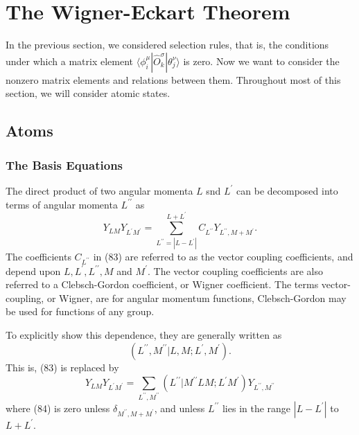 \section{The Wigner-Eckart Theorem}

In the previous section, we considered selection rules, that is, the 
conditions under which a matrix element $\langle \phi^{\mu}_i | 
{\hat{O}}^{\sigma}_k | \theta^{\nu}_j \rangle$ is zero.  Now we want 
to consider the nonzero matrix elements and relations between them. 
Throughout most of this section, we will consider atomic states.

\subsection{Atoms}

\subsubsection{The Basis Equations}

The direct product of two angular momenta $L$ snd $L^{\prime}$ can be 
decomposed into terms of angular momenta $L^{\prime \prime}$ as
\begin{equation}
Y_{LM} Y_{L^{\prime}M^{\prime}} = \sum^{L+L^{\prime}}_{L^{\prime 
\prime}=| L- L^{\prime}|} C_{L^{\prime \prime}}Y_{L^{\prime 
\prime},M+M^{\prime}}.
\label{chap16-eqno83}
\end{equation}
The coefficients $C_{L^{\prime \prime}}$ in (83) are referred to as 
the vector coupling coefficients, and depend upon $L, L^{\prime}, 
L^{\prime \prime}, M$ and $M^{\prime}$.  The vector coupling 
coefficients are also referred to a Clebsch-Gordon coefficient, or 
Wigner coefficient.  The terms vector-coupling, or Wigner, are for 
angular momentum functions, Clebsch-Gordon may be used for functions 
of any group. 

To explicitly show this dependence, they are generally written as
\begin{equation}
\left( L^{\prime \prime} , M^{\prime \prime} | L, M ; L^{\prime} , 
M^{\prime} \right).
\label{chap16-eqno84}
\end{equation}
This is, (83) is replaced by
\begin{equation}
Y_{LM} Y_{L^{\prime}M^{\prime}} = \sum_{L^{\prime \prime} , M^{\prime 
\prime}} \left( L^{\prime \prime} | M^{\prime \prime}  LM ; L^{\prime} 
M^{\prime} \right) Y_{L^{\prime \prime} , M^{\prime \prime}}
\label{chap16-eqno85}
\end{equation}
where (84) is zero unless $\delta_{M^{\prime \prime},M+M^{\prime}}$, 
and unless $L^{\prime \prime}$ lies in the range $|L - L^{\prime}|$ 
to $L+L^{\prime}$.

